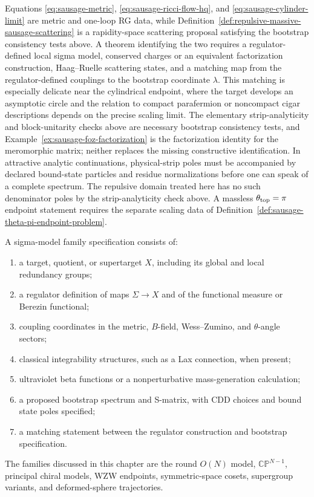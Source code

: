 \begin{remark}
\label{ca:sausage-bootstrap-matching}
Equations \eqref{eq:sausage-metric}, \eqref{eq:sausage-ricci-flow-hq}, and
\eqref{eq:sausage-cylinder-limit} are metric and one-loop RG data, while
Definition~\ref{def:repulsive-massive-sausage-scattering} is a
rapidity-space scattering proposal satisfying the bootstrap consistency tests
above.  A theorem identifying the two requires a regulator-defined local sigma
model, conserved charges or an equivalent factorization construction,
Haag--Ruelle scattering states, and a matching map from the regulator-defined
couplings to the bootstrap coordinate \(\lambda\).  This matching is
especially delicate near the cylindrical endpoint, where the target develops
an asymptotic circle and the relation to compact parafermion or noncompact
cigar descriptions depends on the precise scaling limit.  The elementary
strip-analyticity and block-unitarity checks above are necessary bootstrap
consistency tests, and
Example~\ref{ex:sausage-foz-factorization} is the factorization
identity for the meromorphic matrix; neither replaces the missing
constructive identification.  In attractive analytic continuations,
physical-strip poles must be accompanied by declared bound-state particles
and residue normalizations before one can speak of a complete spectrum.  The
repulsive domain treated here has no such denominator poles by the
strip-analyticity check above.  A massless
\(\theta_{\rm top}=\pi\) endpoint statement requires the separate scaling
data of Definition~\ref{def:sausage-theta-pi-endpoint-problem}.
\end{remark}

\begin{definition}
\label{def:sigma-model-family-specification}
A sigma-model family specification consists of:
\begin{enumerate}
  \item a target, quotient, or supertarget \(X\), including its global and
  local redundancy groups;
  \item a regulator definition of maps \(\Sigma\to X\) and of the functional
  measure or Berezin functional;
  \item coupling coordinates in the metric, \(B\)-field, Wess--Zumino, and
  \(\theta\)-angle sectors;
  \item classical integrability structures, such as a Lax connection, when present;
  \item ultraviolet beta functions or a nonperturbative mass-generation
  calculation;
  \item a proposed bootstrap spectrum and S-matrix, with CDD choices and bound
  state poles specified;
  \item a matching statement between the regulator construction and bootstrap
  specification.
\end{enumerate}
The families discussed in this chapter are the round \(O(N)\) model,
\(\mathbb{CP}^{N-1}\), principal chiral models, WZW endpoints, symmetric-space
cosets, supergroup variants, and deformed-sphere trajectories.
\end{definition}

